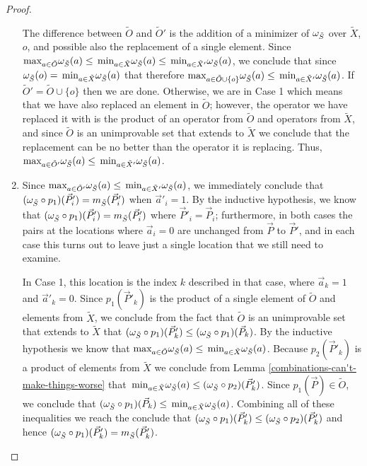 \documentclass[twocolumn,showpacs,preprintnumbers,amsmath,amssymb,nofootinbib,pra,floatfix]{revtex4-1}
\newcommand{\lst}{\vec}
\newcommand{\set}{\tilde}
\begin{document}
\begin{proof}
\begin{enumerate}
The difference between $\set O$ and $\set O'$ is the addition of a minimizer of $\om_{\set S}$ over $\set X$, $o$, and possible also the replacement of a single element.  Since $\max_{a\in\set O}\om_{\set S}(a)\le\min_{a\in\set X}\om_{\set S}(a)\le\min_{a\in\set X'}\om_{\set S}(a)$, we conclude that since $\om_{\set S}(o)=\min_{a\in\set X}\om_{\set S}(a)$ that therefore $\max_{a\in\set O\cup\{o\}}\om_{\set S}(a)\le\min_{a\in\set X'}\om_{\set S}(a)$.  If $\set O'=\set O\cup\{o\}$ then we are done.  Otherwise, we are in Case 1 which means that we have also replaced an element in $\set O$;  however, the operator we have replaced it with is the product of an operator from $\set O$ and operators from $\set X$, and since $\set O$ is an unimprovable set that extends to $\set X$ we conclude that the replacement can be no better than the operator it is replacing.  Thus, $\max_{a\in\set O'}\om_{\set S}(a)\le\min_{a\in\set X'}\om_{\set S}(a)$.
\item

Since $\max_{a\in\set O'}\om_{\set S}(a)\le\min_{a\in\set X'}\om_{\set S}(a)$, we immediately conclude that $(\om_{\set S}\circ p_1)(\lst P'_i)=m_{\set S}(\lst P'_i)$ when $\lst a'_i=1$.  By the inductive hypothesis, we know that $(\om_{\set S}\circ p_1)(\lst P'_i)=m_{\set S}(\lst P'_i)$ where $\lst P'_i=\lst P_i$;  furthermore, in both cases the pairs at the locations where $\lst a_i=0$ are unchanged from $\lst P$ to $\lst P'$, and in each case this turns out to leave just a single location that we still need to examine.

In Case 1, this location is the index $k$ described in that case, where $\lst a_k=1$ and $\lst a'_k=0$.  Since $p_1(\lst P'_k)$ is the product of a single element of $\set O$ and elements from $\set X$, we conclude from the fact that $\set O$ is an unimprovable set that extends to $\set X$ that $(\om_{\set S}\circ p_1)(\lst P'_k)\le(\om_{\set S}\circ p_1)(\lst P_k)$.  By the inductive hypothesis we know that $\max_{a\in\set O}\om_{\set S}(a)\le\min_{a\in\set X}\om_{\set S}(a)$.  Because $p_2(\lst P'_k)$ is a product of elements from $\set X$ we conclude from Lemma \ref{combinations-can't-make-things-worse} that $\min_{a\in\set X}\om_{\set S}(a)\le (\om_{\set S}\circ p_2)(\lst P'_k)$.  Since $p_1(\lst P)\in\set O$, we conclude that $(\om_{\set S}\circ p_1)(\lst P_k)\le\min_{a\in\set X}\om_{\set S}(a)$.  Combining all of these inequalities we reach the conclude that $(\om_{\set S}\circ p_1)(\lst P'_k)\le(\om_{\set S}\circ p_2)(\lst P'_k)$ and hence $(\om_{\set S}\circ p_1)(\lst P'_k)=m_{\set S}(\lst P'_k)$.


\end{enumerate}
\end{proof}
\end{document}

